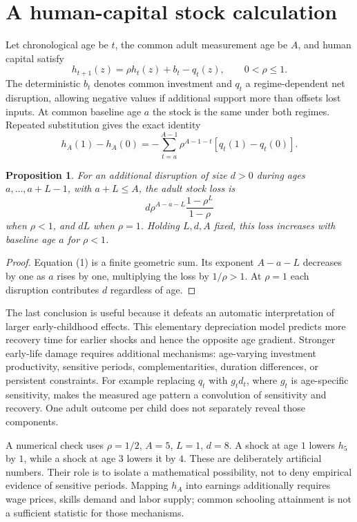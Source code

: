 \documentclass[11pt,a4paper]{article}
\newtheorem{proposition}[theorem]{Proposition}
\begin{document}
\section{A human-capital stock calculation}
Let chronological age be $t$, the common adult measurement age be $A$, and human capital satisfy
\[
 h_{t+1}(z)=\rho h_t(z)+b_t-q_t(z),\qquad 0<\rho\le1.
\]
The deterministic $b_t$ denotes common investment and $q_t$ a regime-dependent net disruption, allowing negative values if additional support more than offsets lost inputs. At common baseline age $a$ the stock is the same under both regimes. Repeated substitution gives the exact identity
\[
 h_A(1)-h_A(0)=-\sum_{t=a}^{A-1}\rho^{A-1-t}[q_t(1)-q_t(0)].
\tag{1}
\]
\begin{proposition}
For an additional disruption of size $d>0$ during ages $a,\ldots,a+L-1$, with $a+L\le A$, the adult stock loss is
\[
 d\rho^{A-a-L}\frac{1-\rho^L}{1-\rho}
\]
when $\rho<1$, and $dL$ when $\rho=1$. Holding $L,d,A$ fixed, this loss increases with baseline age $a$ for $\rho<1$.
\end{proposition}
\begin{proof}
Equation (1) is a finite geometric sum. Its exponent $A-a-L$ decreases by one as $a$ rises by one, multiplying the loss by $1/\rho>1$. At $\rho=1$ each disruption contributes $d$ regardless of age.
\end{proof}
The last conclusion is useful because it defeats an automatic interpretation of larger early-childhood effects. This elementary depreciation model predicts more recovery time for earlier shocks and hence the opposite age gradient. Stronger early-life damage requires additional mechanisms: age-varying investment productivity, sensitive periods, complementarities, duration differences, or persistent constraints. For example replacing $q_t$ with $g_t d_t$, where $g_t$ is age-specific sensitivity, makes the measured age pattern a convolution of sensitivity and recovery. One adult outcome per child does not separately reveal those components.

A numerical check uses $\rho=1/2$, $A=5$, $L=1$, $d=8$. A shock at age $1$ lowers $h_5$ by $1$, while a shock at age $3$ lowers it by $4$. These are deliberately artificial numbers. Their role is to isolate a mathematical possibility, not to deny empirical evidence of sensitive periods. Mapping $h_A$ into earnings additionally requires wage prices, skills demand and labor supply; common schooling attainment is not a sufficient statistic for those mechanisms.
\end{document}
